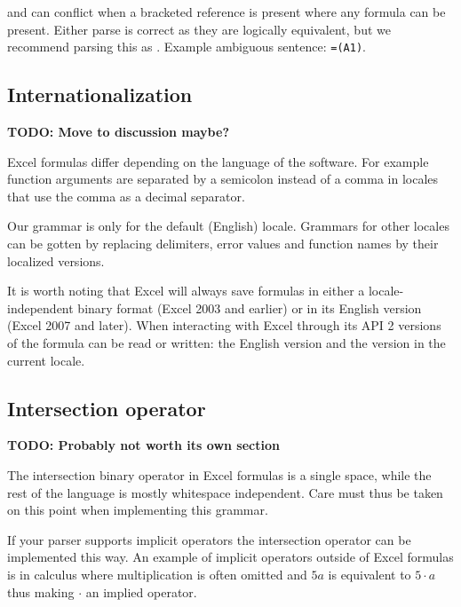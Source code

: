 \documentclass[conference]{IEEEtran}
\newcommand{\todo}[1]{\textbf{TODO: #1}}
\begin{document}
 and  can conflict when a bracketed reference is present where any formula can be present. Either parse is correct as they are logically equivalent, but we recommend parsing this as . Example ambiguous sentence: \texttt{=(A1)}.

\subsection{Internationalization}

\todo{Move to discussion maybe?}

Excel formulas differ depending on the language of the software. For example function arguments are separated by a semicolon instead of a comma in locales that use the comma as a decimal separator.

Our grammar is only for the default (English) locale. Grammars for other locales can be gotten by replacing delimiters, error values and function names by their localized versions.

It is worth noting that Excel will always save formulas in either a locale-independent binary format (Excel 2003 and earlier) or in its English version (Excel 2007 and later). When interacting with Excel through its API 2 versions of the formula can be read or written: the English version and the version in the current locale.

\subsection{Intersection operator}

\todo{Probably not worth its own section}

The intersection binary operator in Excel formulas is a single space, while the rest of the language is mostly whitespace independent.
Care must thus be taken on this point when implementing this grammar.

If your parser supports implicit operators the intersection operator can be implemented this way.
An example of implicit operators outside of Excel formulas is in calculus where multiplication is often omitted and $5a$ is equivalent to $5 \cdot a$ thus making $\cdot$ an implied operator.
\end{document}
